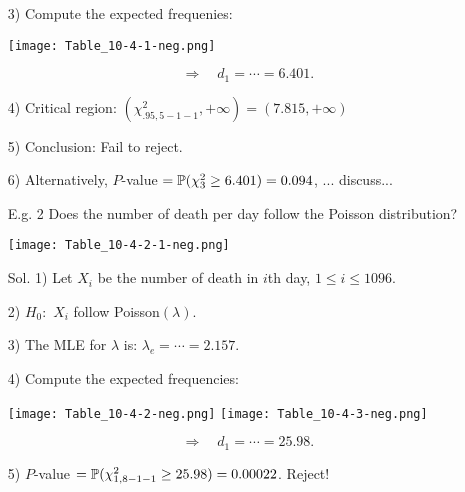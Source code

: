 \begin{frame}

\begin{enumerate}
\item[] 3) Compute the expected frequenies:
\begin{center}
\texttt{[image: Table\_10-4-1-neg.png]}
\end{center}
\[
\Longrightarrow\quad			d_1 = \cdots = 6.401.
\]
\vfill
\item[] 4) Critical region: $(\chi^2_{.95,5-1-1},+\infty) =(7.815,+\infty) $
\item[] 5) Conclusion: Fail to reject.
\vfill
\item[] 6) Alternatively, $P$-value $=\mathbb{P}(\chi_3^2\ge 6.401) =  0.094$, ... discuss...\myEnd
\end{enumerate}
\end{frame}
\begin{frame}

\begin{enumerate}
\item[E.g. 2] Does the number of death per day follow the Poisson distribution?
	\vfill
\begin{center}
\texttt{[image: Table\_10-4-2-1-neg.png]}
\end{center}
\end{enumerate}
\end{frame}
\begin{frame}
	\begin{enumerate}
		\item[Sol.] 1) Let $X_i$ be the number of death in $i$th day, $1\le i\le 1096$.\\
			\vfill
		\item[] 2) $H_0:$ $X_i$ follow Poisson$(\lambda)$.
			\vfill
		\item[] 3) The MLE for $\lambda$ is: $\lambda_e = \cdots = 2.157$.
			\vfill
		\item[] 4) Compute the expected frequencies:
\begin{center}
\texttt{[image: Table\_10-4-2-neg.png]}
\texttt{[image: Table\_10-4-3-neg.png]}
\end{center}
\pause
\[
\Longrightarrow \quad d_1 = \cdots = 25.98.
\]
\vfill
\pause
\item[] 5) $P$-value $= \mathbb{P}(\chi_{1,8-1-1}^2\ge 25.98) =0.00022$. Reject! \myEnd
	\end{enumerate}
\end{frame}
